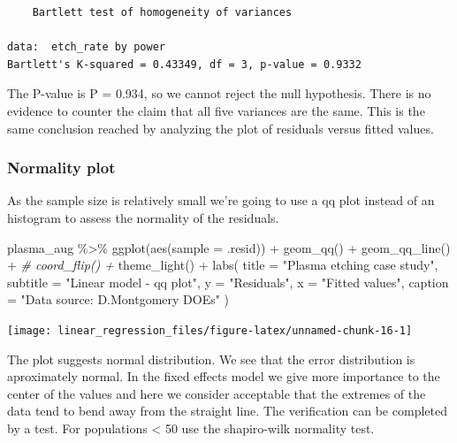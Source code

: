 \documentclass[
]{book}
\newenvironment{Shaded}{\begin{snugshade}}{\end{snugshade}}
\newcommand{\AttributeTok}[1]{\textcolor[rgb]{0.77,0.63,0.00}{#1}}
\newcommand{\CommentTok}[1]{\textcolor[rgb]{0.56,0.35,0.01}{\textit{#1}}}
\newcommand{\FunctionTok}[1]{\textcolor[rgb]{0.00,0.00,0.00}{#1}}
\newcommand{\NormalTok}[1]{#1}
\newcommand{\SpecialCharTok}[1]{\textcolor[rgb]{0.00,0.00,0.00}{#1}}
\newcommand{\StringTok}[1]{\textcolor[rgb]{0.31,0.60,0.02}{#1}}
\begin{document}
\begin{verbatim}
	Bartlett test of homogeneity of variances

data:  etch_rate by power
Bartlett's K-squared = 0.43349, df = 3, p-value = 0.9332
\end{verbatim}

The P-value is P = 0.934, so we cannot reject the null hypothesis. There is no evidence to counter the claim that all five variances are the same. This is the same conclusion reached by analyzing the plot of residuals versus fitted values.

\hypertarget{normality-plot}{%
\subsubsection{Normality plot}\label{normality-plot}}

As the sample size is relatively small we're going to use a qq plot instead of an histogram to assess the normality of the residuals.

\begin{Shaded}
\begin{Highlighting}[]
\NormalTok{plasma\_aug }\SpecialCharTok{\%\textgreater{}\%}
  \FunctionTok{ggplot}\NormalTok{(}\FunctionTok{aes}\NormalTok{(}\AttributeTok{sample =}\NormalTok{ .resid)) }\SpecialCharTok{+}
  \FunctionTok{geom\_qq}\NormalTok{() }\SpecialCharTok{+}
  \FunctionTok{geom\_qq\_line}\NormalTok{() }\SpecialCharTok{+}
  \CommentTok{\# coord\_flip() +}
  \FunctionTok{theme\_light}\NormalTok{() }\SpecialCharTok{+}
  \FunctionTok{labs}\NormalTok{(}
    \AttributeTok{title =} \StringTok{"Plasma etching case study"}\NormalTok{,}
    \AttributeTok{subtitle =} \StringTok{"Linear model {-} qq plot"}\NormalTok{,}
    \AttributeTok{y =} \StringTok{"Residuals"}\NormalTok{,}
    \AttributeTok{x =} \StringTok{"Fitted values"}\NormalTok{,}
    \AttributeTok{caption =} \StringTok{"Data source: D.Montgomery DOEs"}
\NormalTok{  )}
\end{Highlighting}
\end{Shaded}

\texttt{[image: linear\_regression\_files/figure-latex/unnamed-chunk-16-1]}

The plot suggests normal distribution. We see that the error distribution is aproximately normal. In the fixed effects model we give more importance to the center of the values and here we consider acceptable that the extremes of the data tend to bend away from the straight line.
The verification can be completed by a test. For populations \textless{} 50 use the shapiro-wilk normality test.
\end{document}

